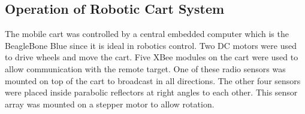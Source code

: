 \subsection{Operation of Robotic Cart System}
The mobile cart was controlled by a central embedded computer which is the BeagleBone Blue since it is ideal in robotics control. Two DC motors were used to drive wheels and move the cart. Five XBee modules on the cart were used to allow communication with the remote target. One of these radio sensors was mounted on top of the cart to broadcast in all directions. The other four sensors were placed inside parabolic reflectors at right angles to each other. This sensor array was mounted on a stepper motor to allow rotation.



